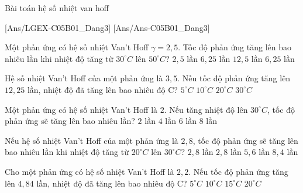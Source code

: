 \documentclass[Main.tex]{subfiles}
\begin{document}
\begin{dang}{Bài toán hệ số nhiệt van hoff}
\end{dang}
[Ans/LGEX-C05B01_Dang3]
[Ans/Ans-C05B01_Dang3]
\begin{ex}
	Một phản ứng có hệ số nhiệt Van't Hoff $\gamma = 2{,}5$. Tốc độ phản ứng tăng lên bao nhiêu lần khi nhiệt độ tăng từ $30^\circ C$ lên $50^\circ C$?
	\choice
	{$2{,}5$ lần}
	{$6{,}25$ lần}
	{$12{,}5$ lần}
	{\True $6{,}25$ lần}
\end{ex}

\begin{ex}
	Hệ số nhiệt Van't Hoff của một phản ứng là $3{,}5$. Nếu tốc độ phản ứng tăng lên $12{,}25$ lần, nhiệt độ đã tăng lên bao nhiêu độ C?
	\choice
	{$5^\circ C$}
	{$10^\circ C$}
	{\True $20^\circ C$}
	{$30^\circ C$}
\end{ex}

\begin{ex}
	Một phản ứng có hệ số nhiệt Van't Hoff là $2$. Nếu tăng nhiệt độ lên $30^\circ C$, tốc độ phản ứng sẽ tăng lên bao nhiêu lần?
	\choice
	{$2$ lần}
	{$4$ lần}
	{$6$ lần}
	{\True $8$ lần}
\end{ex}

\begin{ex}
	Nếu hệ số nhiệt Van't Hoff của một phản ứng là $2{,}8$, tốc độ phản ứng sẽ tăng lên bao nhiêu lần khi nhiệt độ tăng từ $20^\circ C$ lên $30^\circ C$?
	\choice
	{$2{,}8$ lần}
	{\True $2{,}8$ lần}
	{$5{,}6$ lần}
	{$8{,}4$ lần}
\end{ex}

\begin{ex}
	Cho một phản ứng có hệ số nhiệt Van't Hoff là $2{,}2$. Nếu tốc độ phản ứng tăng lên $4{,}84$ lần, nhiệt độ đã tăng lên bao nhiêu độ C?
	\choice
	{$5^\circ C$}
	{\True $10^\circ C$}
	{$15^\circ C$}
	{$20^\circ C$}
\end{ex}
\end{document}
